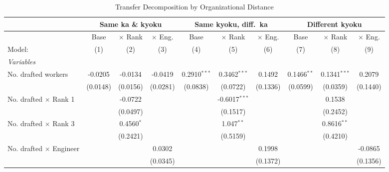 \begin{table}[htbp]
\centering
\caption{Transfer Decomposition by Organizational Distance}
\label{tab:transfer-decomposition}
\scriptsize
\begin{threeparttable}
\begin{tabular}{lccccccccc}
   \tabularnewline \midrule \midrule
 & \multicolumn{3}{c}{Same ka \& kyoku} & \multicolumn{3}{c}{Same kyoku, diff.\ ka} & \multicolumn{3}{c}{Different kyoku} \\
\midrule
                                  & Base     & $\times$ Rank  & $\times$ Eng.  & Base           & $\times$ Rank   & $\times$ Eng.  & Base          & $\times$ Rank  & $\times$ Eng. \\    
   Model:                         & (1)      & (2)            & (3)            & (4)            & (5)             & (6)            & (7)           & (8)            & (9)\\  
   \midrule
   \emph{Variables}\\
   No. drafted workers            & -0.0205  & -0.0134        & -0.0419        & 0.2910$^{***}$ & 0.3462$^{***}$  & 0.1492         & 0.1466$^{**}$ & 0.1341$^{***}$ & 0.2079\\   
                                  & (0.0148) & (0.0156)       & (0.0281)       & (0.0838)       & (0.0722)        & (0.1336)       & (0.0599)      & (0.0359)       & (0.1440)\\   
   No. drafted $\times$ Rank 1    &          & -0.0722        &                &                & -0.6017$^{***}$ &                &               & 0.1538         &   \\   
                                  &          & (0.0497)       &                &                & (0.1517)        &                &               & (0.2452)       &   \\   
   No. drafted $\times$ Rank 3    &          & 0.4560$^{*}$   &                &                & 1.047$^{**}$    &                &               & 0.8616$^{**}$  &   \\   
                                  &          & (0.2421)       &                &                & (0.5159)        &                &               & (0.4210)       &   \\   
   No. drafted $\times$ Engineer  &          &                & 0.0302         &                &                 & 0.1998         &               &                & -0.0865\\   
                                  &          &                & (0.0345)       &                &                 & (0.1372)       &               &                & (0.1356)\\   

\end{tabular}
\end{threeparttable}
\end{table}
